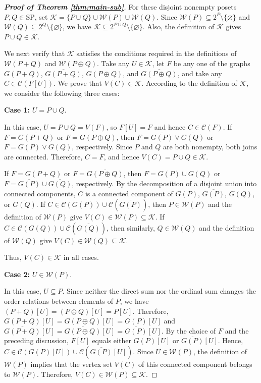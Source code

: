 \documentclass[11pt,a4paper]{article}
\begin{document}
\begin{proof}[\rm\textbf{Proof of Theorem \ref{thm:main-sub}}]
For these disjoint nonempty posets $P,Q\in\mathrm{SP}$,
set $\mathcal K=\{P\cup Q\}\cup\mathcal W(P)\cup\mathcal W(Q)$.
Since $\mathcal W(P)\subseteq 2^P\setminus\{\varnothing\}$
and $\mathcal W(Q)\subseteq 2^Q\setminus\{\varnothing\}$,
we have $\mathcal K\subseteq 2^{P\cup Q}\setminus\{\varnothing\}$.
Also, the definition of $\mathcal K$ gives $P\cup Q\in\mathcal K$.


We next verify that $\mathcal K$ satisfies the conditions
required in the definitions of $\mathcal W(P+Q)$ and $\mathcal W(P\oplus Q)$.
Take any $U\in\mathcal K$, let $F$ be any one of the graphs
$G(P+Q)$, $\overline{G(P+Q)}$, $G(P\oplus Q)$, and $\overline{G(P\oplus Q)}$,
and take any $C\in\mathcal C(F[U])$.
We prove that $V(C)\in\mathcal K$.
According to the definition of $\mathcal K$, we consider the following three cases:

\textbf{Case 1:} $U=P\cup Q$.

In this case, $U=P\cup Q=V(F)$, so $F[U]=F$ and hence $C\in\mathcal C(F)$.
If $F=\overline{G(P+Q)}$ or $F=G(P\oplus Q)$,
then $F=\overline{G(P)}\vee\overline{G(Q)}$ or $F=G(P)\vee G(Q)$, respectively.
Since $P$ and $Q$ are both nonempty, both joins are connected.
Therefore, $C=F$, and hence $V(C)=P\cup Q\in\mathcal K$.

If $F=G(P+Q)$ or $F=\overline{G(P\oplus Q)}$, then $F=G(P)\cup G(Q)$
or $F=\overline{G(P)}\cup\overline{G(Q)}$, respectively.
By the decomposition of a disjoint union into connected components,
$C$ is a connected component of $G(P)$, $\overline{G(P)}$, $G(Q)$, or $\overline{G(Q)}$.
If $C\in\mathcal C(G(P))\cup\mathcal C(\overline{G(P)})$,
then $P\in\mathcal W(P)$ and the definition of $\mathcal W(P)$
give $V(C)\in\mathcal W(P)\subseteq\mathcal K$.
If $C\in\mathcal C(G(Q))\cup\mathcal C(\overline{G(Q)})$,
then similarly, $Q\in\mathcal W(Q)$ and the definition of $\mathcal W(Q)$ give
$V(C)\in\mathcal W(Q)\subseteq\mathcal K$.

Thus, $V(C)\in\mathcal K$ in all cases.

\textbf{Case 2:} $U\in\mathcal W(P)$.

In this case, $U\subseteq P$.
Since neither the direct sum nor the ordinal sum changes
the order relations between elements of $P$,
we have $(P+Q)[U]=(P\oplus Q)[U]=P[U]$.
Therefore, $G(P+Q)[U]=G(P\oplus Q)[U]=G(P)[U]$ and
$\overline{G(P+Q)}[U]=\overline{G(P\oplus Q)}[U]=\overline{G(P)}[U]$.
By the choice of $F$ and the preceding discussion,
$F[U]$ equals either $G(P)[U]$ or $\overline{G(P)}[U]$.
Hence, $C\in\mathcal C(G(P)[U])\cup\mathcal C(\overline{G(P)}[U])$.
Since $U\in\mathcal W(P)$, the definition of $\mathcal W(P)$ implies that
the vertex set $V(C)$ of this connected component belongs to $\mathcal W(P)$.
Therefore, $V(C)\in\mathcal W(P)\subseteq\mathcal K$.


\end{proof}
\end{document}
